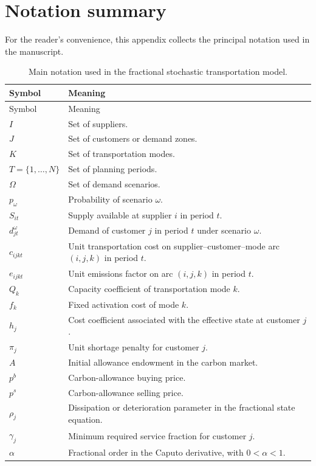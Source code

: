 \section{Notation summary}
For the reader's convenience, this appendix collects the principal notation used in the manuscript.

\begin{longtable}{p{}p{}}
\caption{Main notation used in the fractional stochastic transportation model.}\\
\toprule
Symbol & Meaning\\
\midrule
\endfirsthead
\toprule
Symbol & Meaning\\
\midrule
\endhead
$I$ & Set of suppliers.\\
$J$ & Set of customers or demand zones.\\
$K$ & Set of transportation modes.\\
$T=\{1,\dots,N\}$ & Set of planning periods.\\
$\Omega$ & Set of demand scenarios.\\
$p_{\omega}$ & Probability of scenario $\omega$.\\
$S_{it}$ & Supply available at supplier $i$ in period $t$.\\
$d_{jt}^{\omega}$ & Demand of customer $j$ in period $t$ under scenario $\omega$.\\
$c_{ijkt}$ & Unit transportation cost on supplier--customer--mode arc $(i,j,k)$ in period $t$.\\
$e_{ijkt}$ & Unit emissions factor on arc $(i,j,k)$ in period $t$.\\
$Q_k$ & Capacity coefficient of transportation mode $k$.\\
$f_k$ & Fixed activation cost of mode $k$.\\
$h_j$ & Cost coefficient associated with the effective state at customer $j$.\\
$\pi_j$ & Unit shortage penalty for customer $j$.\\
$A$ & Initial allowance endowment in the carbon market.\\
$p^b$ & Carbon-allowance buying price.\\
$p^s$ & Carbon-allowance selling price.\\
$\rho_j$ & Dissipation or deterioration parameter in the fractional state equation.\\
$\gamma_j$ & Minimum required service fraction for customer $j$.\\
$\alpha$ & Fractional order in the Caputo derivative, with $0<\alpha<1$.\\

\end{longtable}
